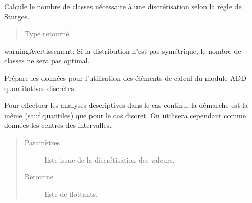 \documentclass[letterpaper,10pt,french]{sphinxmanual}
\begin{document}
\begin{fulllineitems}
\label{\detokenize{addQuantitativesContinues:add.addQuantitativesContinues.calculNombreClasses}}
Calcule le nombre de classes nécessaire à une discrétisation selon la règle de Sturges.
\begin{quote}\begin{description}
\item[{Type retourné}] \leavevmode
{}

\end{description}\end{quote}

\begin{sphinxadmonition}{warning}{Avertissement:}
Si la distribution n’est pas symétrique, le nombre de classes ne sera pas optimal.
\end{sphinxadmonition}

\end{fulllineitems}


\begin{fulllineitems}
\label{\detokenize{addQuantitativesContinues:add.addQuantitativesContinues.preparationIntervallesAnalyse}}
Prépare les données pour l’utilisation des éléments de calcul du module ADD quantitatives discrètes.

Pour effectuer les analyses descriptives dans le cas continu, la démarche est la même (sauf quantiles) que pour le cas discret.
On utilisera cependant comme données les centres des intervalles.
\begin{quote}\begin{description}
\item[{Paramètres}] \leavevmode
{} \textendash{} liste issue de la discrétisation des valeurs.

\item[{Retourne}] \leavevmode
liste de flottants.

\end{description}\end{quote}

\end{fulllineitems}
\end{document}
